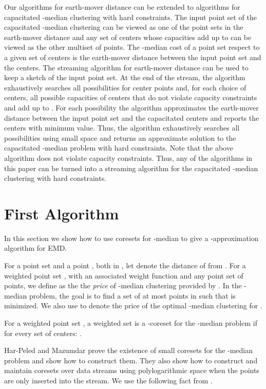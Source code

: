 \documentclass[oribibl]{llncs}
\begin{document}
Our algorithms for earth-mover distance can be extended to algorithms for
capacitated -median clustering with hard constraints.
The input point set of the capacitated -median clustering can be viewed
as one of the point sets in the earth-mover distance and any set
of  centers whose capacities add up to  can be viewed as
the other multiset of points.
The -median cost of a point set respect to a given set of centers
is the earth-mover distance between the input point set and the centers.
The streaming algorithm for earth-mover distance can be used
to keep a sketch of the input point set. At the end of the stream,
the algorithm exhaustively searches all possibilities for  center points and,
for each choice of  centers, all possible capacities of centers that do
not violate capacity constraints and add up to .
For each possibility the algorithm approximates the
earth-mover distance between the input point set and the capacitated centers
and reports the centers with minimum value. Thus, the algorithm
exhaustively searches all  possibilities using small space
and returns an approximate solution
to the capacitated -median problem with hard constraints.
Note that the above algorithm does not violate capacity constraints.
Thus, any of the algorithms in this paper can be turned into a streaming
algorithm for the capacitated -median clustering with hard constraints.

\section{First Algorithm}
 In this section we show how to use coresets for -median to give
a -approximation algorithm for EMD.
 
For a point set  and a point , both in ,
let  denote the distance of 
from .
For a weighted point set , with
an associated weight function 
and any point set  of  points, we define
 as the the \textit{price} of
-median clustering provided by . In the -median
problem, the goal is to find a set  of at most  points
in  such that  is minimized.
We also use 
to denote the price of the optimal -median clustering for .

\begin{definition}[Coreset]
For a weighted point set , a weighted set
 is a -coreset for the
-median problem if for every set  of  centers:
. 
\end{definition}

Har-Peled and Mazumdar \cite{kcoreset} prove the existence of small
coresets for the -median problem and show how to construct them.
They also show how to construct and maintain coresets over data streams
using polylogarithmic space when the points are only inserted into the
stream. We use the following fact from \cite{kcoreset}.
\end{document}
